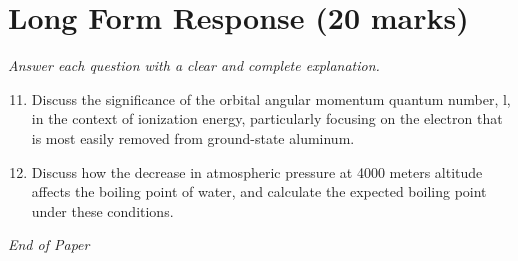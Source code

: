 \documentclass[12pt]{article}
\begin{document}
\section*{Long Form Response (20 marks)}
\textit{Answer each question with a clear and complete explanation.}
\begin{enumerate}[label=\arabic*.]
\setcounter{enumi}{10}
\item Discuss the significance of the orbital angular momentum quantum number, l, in the context of ionization energy, particularly focusing on the electron that is most easily removed from ground-state aluminum.
\item Discuss how the decrease in atmospheric pressure at 4000 meters altitude affects the boiling point of water, and calculate the expected boiling point under these conditions.
\end{enumerate}

\vfill
\noindent\textit{End of Paper}
\end{document}
